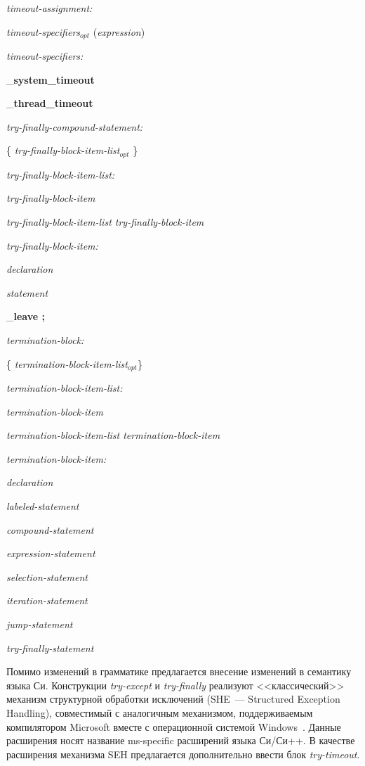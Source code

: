 \begin{multicols}{2}
   \medskip
   \textit{timeout-assignment:}

   \textit{timeout-specifiers$_{opt}$} (\textit{expression})

   \medskip
   \textit{timeout-specifiers:}

   \_\textbf{system\_timeout }

   \_\textbf{thread\_timeout}

   \medskip
   \textit{try-finally-compound-statement:}

   \{\textit{ try-finally-block-item-list$_{opt}$ }\}

   \medskip
   \textit{try-finally-block-item-list:}

   \textit{try-finally-block-item}

   \textit{try-finally-block-item-list try-finally-block-item}

   \medskip
   \textit{try-finally-block-item:}

   \textit{declaration}

   \textit{statement}

   \_\textbf{leave ;}

   \medskip
   \textit{termination-block:}

   \{\textit{ termination-block-item-list}$_{opt}$\}


   \medskip
   \textit{termination-block-item-list:}

   \textit{termination-block-item}

   \textit{termination-block-item-list termination-block-item}

   \medskip
   \textit{termination-block-item:}

   \textit{declaration}

   \textit{labeled-statement}

   \textit{compound-statement}

   \textit{expression-statement}

   \textit{selection-statement}

   \textit{iteration-statement}

   \textit{jump-statement}

   \textit{try-finally-statement}

   \medskip

     Помимо изменений в грамматике предлагается внесение изменений в семантику языка Си.
Конструкции \textit{try-except} и \textit{try-finally} реализуют <<классический>> механизм структурной
обработки исключений (SHE~--- Structured Exception Handling), совместимый с аналогичным
механизмом, поддерживаемым компилятором Microsoft вместе с операционной системой
Windows~\cite{2eg}. Данные расширения носят название ms-specific расширений языка Си/Си++.
В качестве расширения механизма SEH предлагается дополнительно ввести блок
\textit{try-timeout}.


\end{multicols}
